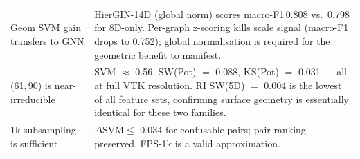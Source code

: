 \begin{center}
\begin{tabular}{lp{9.2cm}}
    Geom SVM gain transfers to GNN & HierGIN-14D (global norm) scores
                            macro-F1\,0.808 vs.\ 0.798 for 8D-only.
                            Per-graph z-scoring kills scale signal (macro-F1
                            drops to 0.752); global normalisation is required
                            for the geometric benefit to manifest. \\[3pt]
    (61,\,90) is near-irreducible & SVM $\approx$ 0.56, SW(Pot) $=$ 0.088,
                            KS(Pot) $=$ 0.031 --- all at full VTK resolution.
                            RI SW(5D) $=$ 0.004 is the lowest of all feature
                            sets, confirming surface geometry is essentially
                            identical for these two families. \\[3pt]
    1k subsampling is sufficient & $\Delta\text{SVM} \leq$ 0.034 for confusable
                            pairs; pair ranking preserved.
                            FPS-1k is a valid approximation. \\
    \bottomrule
  \end{tabular}
\end{center}

